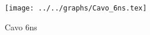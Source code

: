\begin{figure}[h] \centering\texttt{[image: ../../graphs/Cavo\_6ns.tex]}\caption{Cavo 6ns}\label{gr:Cavo_6ns} \end{figure}
